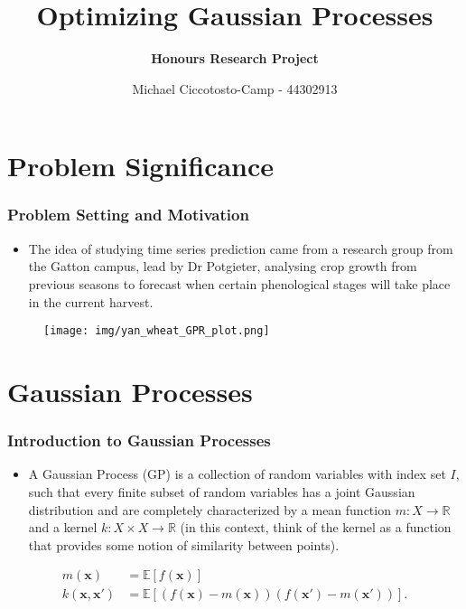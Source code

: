 \documentclass[9pt,hyperref={pdfpagelabels=false},xcolor=table]{beamer}
\title{Optimizing Gaussian Processes}
\author[Michael Ciccotosto-Camp]{{\bf Honours Research Project}}
\date{
Michael Ciccotosto-Camp - 44302913 \\
}
\begin{document}
\maketitle

\section{Problem Significance}

\begin{frame}
    \frametitle{Problem Setting and Motivation}
    \begin{itemize}
        \item The idea of studying time series prediction came from a research group from the Gatton campus, lead by Dr Potgieter, analysing crop growth from previous seasons to forecast when certain phenological stages will take place in the current harvest.
    \end{itemize}
    \begin{figure}
        \centering
        \texttt{[image: img/yan\_wheat\_GPR\_plot.png]}
    \end{figure}
\end{frame}

\section{Gaussian Processes}

\begin{frame}
    \frametitle{Introduction to Gaussian Processes}
    \begin{itemize}
        \item A Gaussian Process (GP) is a collection of random variables with index set $I$, such that every finite subset of random variables has a joint Gaussian distribution and are completely characterized by a mean function $m : X \to \mathbb{R}$ and a kernel $k : X \times X \to \mathbb{R}$ (in this context, think of the kernel as a function that provides some notion of similarity between points).
    \end{itemize}
    \begin{align*}
        m(\bm{x})           & = \mathbb{E} \left[ f(\bm{x}) \right]                                          \\
        k (\bm{x}, \bm{x'}) & = \mathbb{E} \left[ (f(\bm{x}) - m(\bm{x})) (f(\bm{x'}) - m(\bm{x'})) \right].
    \end{align*}
\end{frame}
\end{document}
